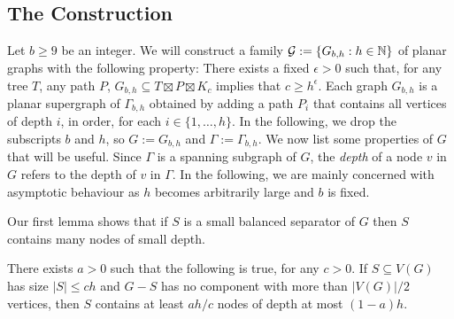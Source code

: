 \documentclass{patmorin}
\newcommand{\defin}[1]{\emph{\color{brightmaroon}#1}}
\begin{document}




\subsection{The Construction}


Let $b\ge 9$ be an integer.  We will construct a family $\mathcal{G}:=\{G_{b,h}:h\in\mathbb{N}\}$ of planar graphs with the following property:  There exists a fixed $\epsilon >0$ such that, for any tree $T$, any path $P$, $G_{b,h}\subseteq T\boxtimes P\boxtimes K_c$ implies that $c\ge h^\epsilon$.  Each graph $G_{b,h}$ is a planar supergraph of $\Gamma_{b,h}$ obtained by adding a path $P_i$ that contains all vertices of depth $i$, in order, for each $i\in\{1,\ldots,h\}$.   In the following, we drop the subscripts $b$ and $h$, so $G:=G_{b,h}$ and $\Gamma:=\Gamma_{b,h}$.  We now list some properties of $G$ that will be useful.  Since $\Gamma$ is a spanning subgraph of $G$, the \defin{depth} of a node $v$ in $G$ refers to the depth of $v$ in $\Gamma$.  In the following, we are mainly concerned with asymptotic behaviour as $h$ becomes arbitrarily large and $b$ is fixed.

Our first lemma shows that if $S$ is a small balanced separator of $G$ then $S$ contains many nodes of small depth.

\begin{lem}\label{small_depth_separator}
  There exists $a >0$ such that the following is true, for any $c>0$.
  If $S\subseteq V(G)$ has size $|S|\le ch$ and $G-S$ has no component with more than $|V(G)|/2$ vertices, then $S$ contains at least $ah/c$ nodes of depth at most $(1-a)h$. 
\end{lem}
\end{document}
